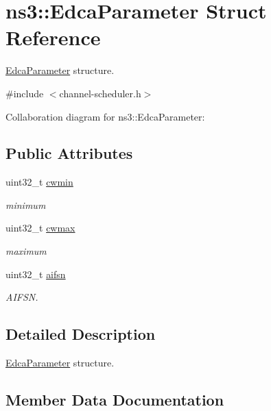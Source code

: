 \hypertarget{structns3_1_1EdcaParameter}{}\section{ns3\+:\+:Edca\+Parameter Struct Reference}
\label{structns3_1_1EdcaParameter}


\hyperlink{structns3_1_1EdcaParameter}{Edca\+Parameter} structure.  




{\ttfamily \#include $<$channel-\/scheduler.\+h$>$}



Collaboration diagram for ns3\+:\+:Edca\+Parameter\+:
\subsection*{Public Attributes}
\begin{DoxyCompactItemize}
\item 
uint32\+\_\+t \hyperlink{structns3_1_1EdcaParameter_a5b87e4eb282d35779384ab34082bb4c6}{cwmin}
\begin{DoxyCompactList}\small\item\em minimum \end{DoxyCompactList}\item 
uint32\+\_\+t \hyperlink{structns3_1_1EdcaParameter_af771d2ef3ccbb1b66f6c90b2efea4d04}{cwmax}
\begin{DoxyCompactList}\small\item\em maximum \end{DoxyCompactList}\item 
uint32\+\_\+t \hyperlink{structns3_1_1EdcaParameter_addba51b9b303804e706625f5dbbe5eaf}{aifsn}
\begin{DoxyCompactList}\small\item\em A\+I\+F\+SN. \end{DoxyCompactList}\end{DoxyCompactItemize}


\subsection{Detailed Description}
\hyperlink{structns3_1_1EdcaParameter}{Edca\+Parameter} structure. 

\subsection{Member Data Documentation}
